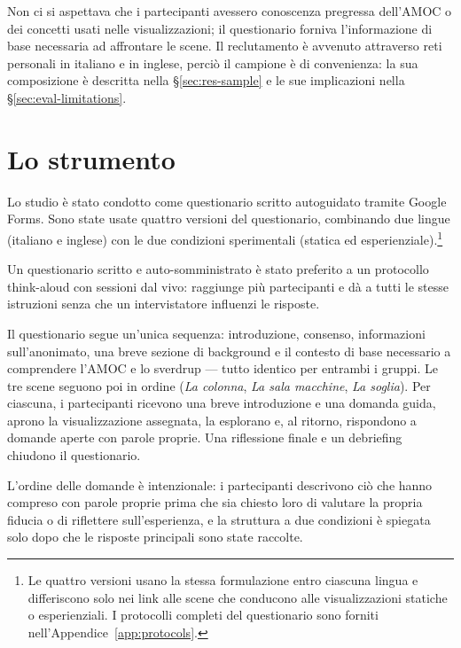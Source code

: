 Non ci si aspettava che i partecipanti avessero conoscenza pregressa dell'AMOC o dei concetti usati nelle visualizzazioni; il questionario forniva l'informazione di base necessaria ad affrontare le scene. Il reclutamento è avvenuto attraverso reti personali in italiano e in inglese, perciò il campione è di convenienza: la sua composizione è descritta nella \S\ref{sec:res-sample} e le sue implicazioni nella \S\ref{sec:eval-limitations}.

\section{Lo strumento}
\label{sec:eval-instrument}

Lo studio è stato condotto come questionario scritto autoguidato tramite Google Forms. Sono state usate quattro versioni del questionario, combinando due lingue (italiano e inglese) con le due condizioni sperimentali (statica ed esperienziale).\footnote{Le quattro versioni usano la stessa formulazione entro ciascuna lingua e differiscono solo nei link alle scene che conducono alle visualizzazioni statiche o esperienziali. I protocolli completi del questionario sono forniti nell'Appendice~\ref{app:protocols}.}



Un questionario scritto e auto-somministrato è stato preferito a un protocollo think-aloud con sessioni dal vivo: raggiunge più partecipanti e dà a tutti le stesse istruzioni senza che un intervistatore influenzi le risposte.

Il questionario segue un'unica sequenza: introduzione, consenso, informazioni sull'anonimato, una breve sezione di background e il contesto di base necessario a comprendere l'AMOC e lo sverdrup --- tutto identico per entrambi i gruppi. Le tre scene seguono poi in ordine (\textit{La colonna}, \textit{La sala macchine}, \textit{La soglia}). Per ciascuna, i partecipanti ricevono una breve introduzione e una domanda guida, aprono la visualizzazione assegnata, la esplorano e, al ritorno, rispondono a domande aperte con parole proprie. Una riflessione finale e un debriefing chiudono il questionario.

L'ordine delle domande è intenzionale: i partecipanti descrivono ciò che hanno compreso con parole proprie prima che sia chiesto loro di valutare la propria fiducia o di riflettere sull'esperienza, e la struttura a due condizioni è spiegata solo dopo che le risposte principali sono state raccolte.

